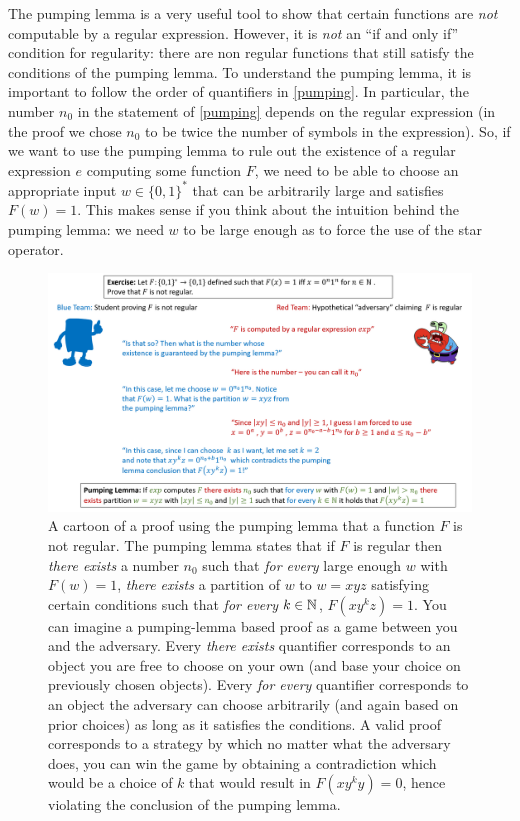 The pumping lemma is a very useful tool to show that certain functions
are \emph{not} computable by a regular expression. However, it is
\emph{not} an ``if and only if'' condition for regularity: there are non
regular functions that still satisfy the conditions of the pumping
lemma. To understand the pumping lemma, it is important to follow the
order of quantifiers in \cref{pumping}. In particular, the number
\(n_0\) in the statement of \cref{pumping} depends on the regular
expression (in the proof we chose \(n_0\) to be twice the number of
symbols in the expression). So, if we want to use the pumping lemma to
rule out the existence of a regular expression \(e\) computing some
function \(F\), we need to be able to choose an appropriate input
\(w\in \{0,1\}^*\) that can be arbitrarily large and satisfies
\(F(w)=1\). This makes sense if you think about the intuition behind the
pumping lemma: we need \(w\) to be large enough as to force the use of
the star operator.


\begin{figure}

\classiccaptionstyle\centering
\includegraphics[width=0.9\paperwidth, height=0.3\paperheight, keepaspectratio]{../figure/pumpinglemmaproof.png}
\caption{A cartoon of a proof using the pumping lemma that a function
\(F\) is not regular. The pumping lemma states that if \(F\) is regular
then \emph{there exists} a number \(n_0\) such that \emph{for every}
large enough \(w\) with \(F(w)=1\), \emph{there exists} a partition of
\(w\) to \(w=xyz\) satisfying certain conditions such that \emph{for
every} \(k\in {\mathbb{N}}\), \(F(xy^kz)=1\). You can imagine a pumping-lemma
based proof as a game between you and the adversary. Every \emph{there
exists} quantifier corresponds to an object you are free to choose on
your own (and base your choice on previously chosen objects). Every
\emph{for every} quantifier corresponds to an object the adversary can
choose arbitrarily (and again based on prior choices) as long as it
satisfies the conditions. A valid proof corresponds to a strategy by
which no matter what the adversary does, you can win the game by
obtaining a contradiction which would be a choice of \(k\) that would
result in \(F(xy^ky)=0\), hence violating the conclusion of the pumping
lemma.}
\label{pumpingprooffig}
\end{figure}


